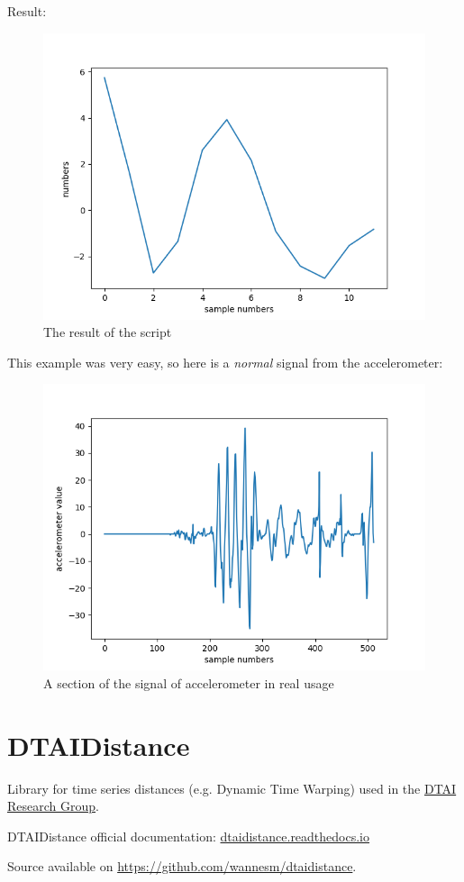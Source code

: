 \documentclass[12pt, a4paper, portrait]{article}
\begin{document}
Result:
\begin{figure}[ht]
\centering
\includegraphics[scale=0.83]{Figure_2.png}
\caption{The result of the script}
\end{figure}
\clearpage
This example was very easy, so here is a \textit{normal} signal from the accelerometer:
\begin{figure}[htp]
\centering
\includegraphics[scale=1.00]{Figure_1.png}
\caption{A section of the signal of accelerometer in real usage}
\end{figure}

\pagebreak
\section{DTAIDistance}
Library for time series distances (e.g. Dynamic Time Warping) used in the \href{https://dtai.cs.kuleuven.be/}{DTAI Research Group}.
\par
DTAIDistance official documentation: \href{https://dtaidistance.readthedocs.io/en/latest/index.html}{dtaidistance.readthedocs.io}
\par Source available on \url{https://github.com/wannesm/dtaidistance}.
\end{document}
